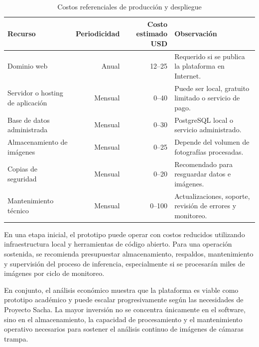 \begin{table}[H]
\centering
\caption{Costos referenciales de producción y despliegue}
\label{tab:costos_produccion}
\begin{tabularx}{\textwidth}{lrrX}
\toprule
\textbf{Recurso} & \textbf{Periodicidad} & \textbf{Costo estimado USD} & \textbf{Observación} \\
\midrule
Dominio web & Anual & 12--25 & Requerido si se publica la plataforma en Internet. \\
Servidor o hosting de aplicación & Mensual & 0--40 & Puede ser local, gratuito limitado o servicio de pago. \\
Base de datos administrada & Mensual & 0--30 & PostgreSQL local o servicio administrado. \\
Almacenamiento de imágenes & Mensual & 0--25 & Depende del volumen de fotografías procesadas. \\
Copias de seguridad & Mensual & 0--20 & Recomendado para resguardar datos e imágenes. \\
Mantenimiento técnico & Mensual & 0--100 & Actualizaciones, soporte, revisión de errores y monitoreo. \\
\bottomrule
\end{tabularx}
\end{table}

En una etapa inicial, el prototipo puede operar con costos reducidos utilizando infraestructura local y herramientas de código abierto. Para una operación sostenida, se recomienda presupuestar almacenamiento, respaldos, mantenimiento y supervisión del proceso de inferencia, especialmente si se procesarán miles de imágenes por ciclo de monitoreo.

En conjunto, el análisis económico muestra que la plataforma es viable como prototipo académico y puede escalar progresivamente según las necesidades de Proyecto Sacha. La mayor inversión no se concentra únicamente en el software, sino en el almacenamiento, la capacidad de procesamiento y el mantenimiento operativo necesarios para sostener el análisis continuo de imágenes de cámaras trampa.
